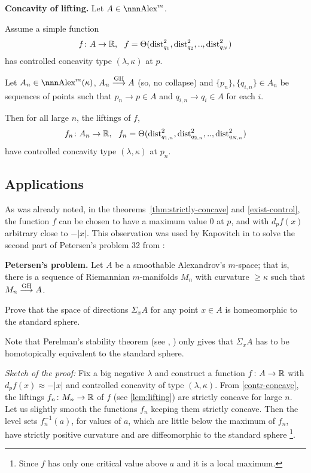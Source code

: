 \documentclass{article}
\begin{document}
\begin{thm}{\bf Concavity of lifting.} \label{lem:lifting}
Let $A\in\Alex^m$.

Assume a simple function 
$$f\:A\to \RR,\ \ f=\Theta(\dist^2_{q_1},\dist^2_{q_2},..,\dist^2_{q_N})$$
has controlled concavity type $(\lambda,\kappa)$ at $p$.

Let $A_n\in\Alex^m(\kappa)$,
$A_n\GHto A$ (so, no collapse) and $\{p_n\},\{q_{i,n}\}\in
A_n$ be sequences of points such that $p_n\to p\in A$ and  $q_{i,n}\to q_i\in A$
for each $i$.

Then for all large $n$, the liftings of $f$,
$$f_n\colon A_n\to \mathbb{R},\ \
f_n=\Theta(\operatorname{dist}^2_{q_{1,n}},\operatorname{dist}^2_{q_{2,n}},..,\operatorname{dist}^2_{q_{N,n}})$$
have controlled concavity type $(\lambda,\kappa)$ at $p_n$. 
\end{thm}


\subsection{Applications} 
\label{app-con-con}


As was already noted, in the theorems~\ref{thm:strictly-concave} and
\ref{exist-control}, the function $f$ can be chosen to have a maximum value $0$ at $p$,
and with $d_p f(x)$ arbitrary close to $-|x|$. 
This observation was used by Kapovitch in \cite{kapovitch:regularity} to solve the second part of Petersen's problem 32 from \cite{petersen:list}:

\begin{thm}
{\bf Petersen's problem.}\label{smoothable}
Let $A$ be a smoothable Alexandrov's $m$-space; 
that is,
there is a sequence of Riemannian $m$-manifolds $M_n$ with curvature $\ge\kappa$
such that $M_n\GHto A$.

Prove that the space of directions $\Sigma_x A$ for any point $x\in A$ is
homeomorphic to the standard sphere.
\end{thm}

Note that Perelman's stability theorem (see  \cite{perelman:spaces2},
\cite{kapovitch:stability}) only gives that $\Sigma_x A$ has to be homotopically
equivalent to the standard sphere.

\bigskip
\noi\textit{Sketch of the proof:}
Fix a big negative $\lambda$ and construct a function $f\colon A\to\mathbb{R}$ with $d_p
f(x)\approx -|x|$ and controlled concavity of type $(\lambda,\kappa)$.
From  \ref{contr-concave}, the liftings  $f_n\colon M_n\to\mathbb{R}$ of  $f$ (see
\ref{lem:lifting}) are strictly concave for large $n$.
Let us slightly smooth the functions $f_n$ keeping them strictly concave.
Then the level sets $f^{-1}_n(a)$, for values of $a$, which are little below the maximum of $f_n$,
have strictly positive curvature and are diffeomorphic to the standard
sphere%
\footnote{Since $f$ has only one critical value above $a$ and it is a local maximum.}.
\end{document}

